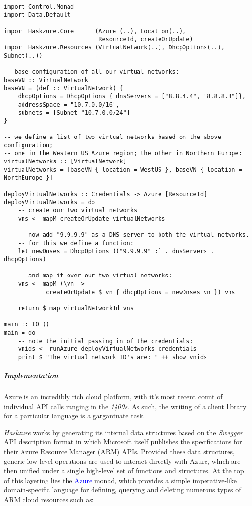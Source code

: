 \documentclass[11pt]{article}
\begin{document}
\newpage

\begin{verbatim}

import Control.Monad
import Data.Default

import Haskzure.Core      (Azure (..), Location(..),
                           ResourceId, createOrUpdate)
import Haskzure.Resources (VirtualNetwork(..), DhcpOptions(..), Subnet(..))

-- base configuration of all our virtual networks:
baseVN :: VirtualNetwork
baseVN = (def :: VirtualNetwork) {
    dhcpOptions = DhcpOptions { dnsServers = ["8.8.4.4", "8.8.8.8"]},
    addressSpace = "10.7.0.0/16",
    subnets = [Subnet "10.7.0.0/24"]
}

-- we define a list of two virtual networks based on the above configuration;
-- one in the Western US Azure region; the other in Northern Europe:
virtualNetworks :: [VirtualNetwork]
virtualNetworks = [baseVN { location = WestUS }, baseVN { location = NorthEurope }]

deployVirtualNetworks :: Credentials -> Azure [ResourceId]
deployVirtualNetworks = do
    -- create our two virtual networks
    vns <- mapM createOrUpdate virtualNetworks

    -- now add "9.9.9.9" as a DNS server to both the virtual networks.
    -- for this we define a function:
    let newDnses = DhcpOptions (("9.9.9.9" :) . dnsServers . dhcpOptions)

    -- and map it over our two virtual networks:
    vns <- mapM (\vn ->
            createOrUpdate $ vn { dhcpOptions = newDnses vn }) vns

    return $ map virtualNetworkId vns

main :: IO ()
main = do
    -- note the initial passing in of the credentials:
    vnids <- runAzure deployVirtualNetworks credentials
    print $ "The virtual network ID's are: " ++ show vnids

\end{verbatim}

\newpage

\subparagraph{Implementation}

Azure is an incredibly rich cloud platform, with it's most recent count of
\ul{individual} API calls ranging in the \textit{1400s}. As such, the writing
of a client library for a particular language is a gargantuate task.

\textit{Haskzure} works by generating its internal data structures based
on the \textit{Swagger} API description format in which Microsoft itself
publishes the specifications for their Azure Resource Manager (ARM) APIs.
Provided these data structures, generic low-level operations are used to
interact directly with Azure, which are then unified under a single high-level
set of functions and structures. \newline
At the top of this layering lies the \textcolor{blue}{Azure} monad, which
provides a simple imperative-like domain-specific language for defining,
querying and deleting numerous types of ARM cloud resources such as:
\end{document}
